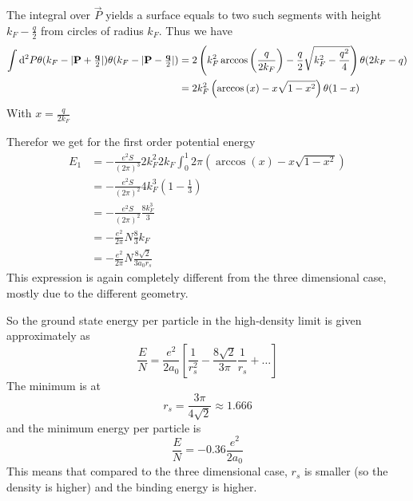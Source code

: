 The integral over $\vec{P}$ yields a surface equals to two such segments with height $k_F - \frac{q}{2}$ from circles of radius $k_F$. Thus we have
\begin{align*}
\int \operatorname{d \!}{^2P} \theta(k_F - |\bm{\mathrm{P}}+\tfrac{\bm{\mathrm{q}}}{2}|)\theta(k_F - |\bm{\mathrm{P}}- \tfrac{\bm{\mathrm{q}}}{2}|) &= 2 \left( k_F^2\arccos \left(\frac{q}{2k_F}\right) - \frac{q}{2}\sqrt{k_F^2 - \frac{q^2}{4}} \right)\theta(2k_F - q) \\
&= 2k_F^2 \left( \arccos \left(x\right) - x\sqrt{1 - x^2} \right)\theta(1 - x)
\end{align*}
With $x = \frac{q}{2k_F}$

Therefor we get for the first order potential energy
\begin{align*}
E_1 &= - \frac{e^2S}{(2\pi)^3}2k_F^2 2k_F\int_0^1 2\pi \left( \arccos \left(x\right) - x\sqrt{1 - x^2} \right) \\
&= - \frac{e^2S}{(2\pi)^2}4k_F^3\left( 1 - \frac{1}{3} \right) \\
&= - \frac{e^2S}{(2\pi)^2} \frac{8k_F^3}{3}\\
&= - \frac{e^2}{2\pi}N \frac{8}{3}k_F \\
&= - \frac{e^2}{2\pi}N \frac{8\sqrt{2}}{3a_0r_s}
\end{align*}
This expression is again completely different from the three dimensional case, mostly due to the different geometry.

So the ground state energy per particle in the high-density limit is given approximately as
\[ \frac{E}{N} = \frac{e^2}{2a_0}\left[\frac{1}{r_s^2} - \frac{8\sqrt{2}}{3\pi}\frac{1}{r_s} + \ldots\right] \]
The minimum is at
\[r_s = \frac{3\pi}{4\sqrt{2}} \approx 1.666\]
and the minimum energy per particle is
\[ \frac{E}{N} = -0.36 \frac{e^2}{2a_0} \]
This means that compared to the three dimensional case, $r_s$ is smaller (so the density is higher) and the binding energy is higher.



